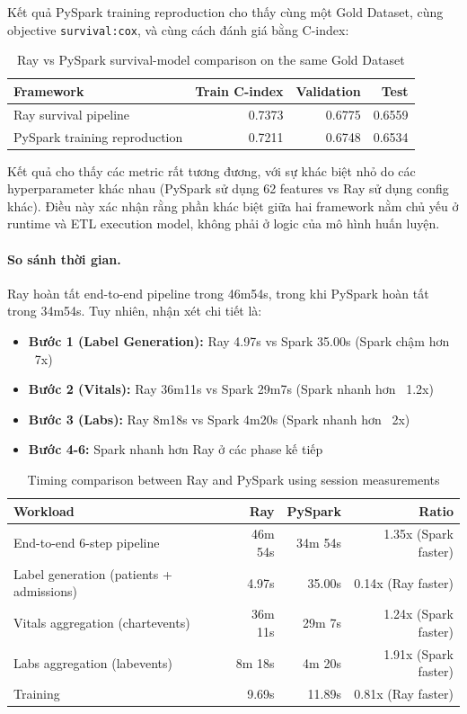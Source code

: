 Kết quả PySpark training reproduction cho thấy cùng một Gold Dataset, cùng objective \texttt{survival:cox}, và cùng cách đánh giá bằng C-index:

\begin{table}[h!]
\centering
\small
\begin{tabular}{|l|r|r|r|}
\hline
\textbf{Framework} & \textbf{Train C-index} & \textbf{Validation} & \textbf{Test} \\
\hline
Ray survival pipeline & 0.7373 & 0.6775 & 0.6559 \\
PySpark training reproduction & 0.7211 & 0.6748 & 0.6534 \\
\hline
\end{tabular}
\caption{Ray vs PySpark survival-model comparison on the same Gold Dataset}
\label{table:ray_vs_spark_cindex}
\end{table}

Kết quả cho thấy các metric rất tương đương, với sự khác biệt nhỏ do các hyperparameter khác nhau (PySpark sử dụng 62 features vs Ray sử dụng config khác). Điều này xác nhận rằng phần khác biệt giữa hai framework nằm chủ yếu ở runtime và ETL execution model, không phải ở logic của mô hình huấn luyện.

\paragraph{So sánh thời gian.} Ray hoàn tất end-to-end pipeline trong 46m54s, trong khi PySpark hoàn tất trong 34m54s. Tuy nhiên, nhận xét chi tiết là:
\begin{itemize}
    \item \textbf{Bước 1 (Label Generation):} Ray 4.97s vs Spark 35.00s (Spark chậm hơn ~7x)
    \item \textbf{Bước 2 (Vitals):} Ray 36m11s vs Spark 29m7s (Spark nhanh hơn ~1.2x)
    \item \textbf{Bước 3 (Labs):} Ray 8m18s vs Spark 4m20s (Spark nhanh hơn ~2x)
    \item \textbf{Bước 4-6:} Spark nhanh hơn Ray ở các phase kế tiếp
\end{itemize}

\begin{table}[h!]
\centering
\small
\begin{tabular}{|l|r|r|r|}
\hline
\textbf{Workload} & \textbf{Ray} & \textbf{PySpark} & \textbf{Ratio} \\
\hline
End-to-end 6-step pipeline & 46m 54s & 34m 54s & 1.35x (Spark faster) \\
Label generation (patients + admissions) & 4.97s & 35.00s & 0.14x (Ray faster) \\
Vitals aggregation (chartevents) & 36m 11s & 29m 7s & 1.24x (Spark faster) \\
Labs aggregation (labevents) & 8m 18s & 4m 20s & 1.91x (Spark faster) \\
Training & 9.69s & 11.89s & 0.81x (Ray faster) \\
\hline
\end{tabular}
\caption{Timing comparison between Ray and PySpark using session measurements}
\label{table:ray_vs_spark_timing}
\end{table}

